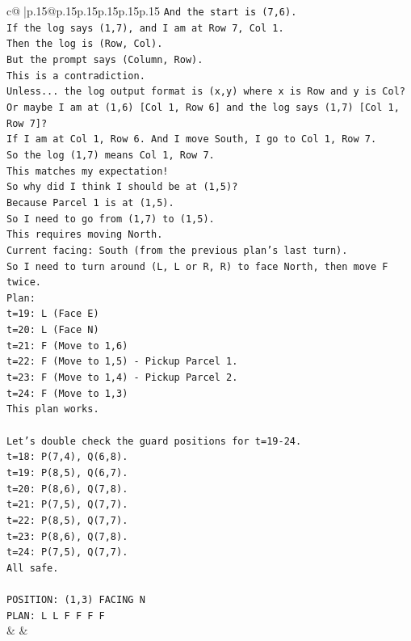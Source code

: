 \documentclass{article}
\begin{document}
{\begin{supertabular}{c@{$\;$}|p{.15\linewidth}@{}p{.15\linewidth}p{.15\linewidth}p{.15\linewidth}p{.15\linewidth}p{.15\linewidth}}
{{{\texttt{And the start is (7,6).} \\
\texttt{If the log says (1,7), and I am at Row 7, Col 1.} \\
\texttt{Then the log is (Row, Col).} \\
\texttt{But the prompt says (Column, Row).} \\
\texttt{This is a contradiction.} \\
\texttt{Unless... the log output format is (x,y) where x is Row and y is Col?} \\
\texttt{Or maybe I am at (1,6) {[}Col 1, Row 6{]} and the log says (1,7) {[}Col 1, Row 7{]}?} \\
\texttt{If I am at Col 1, Row 6. And I move South, I go to Col 1, Row 7.} \\
\texttt{So the log (1,7) means Col 1, Row 7.} \\
\texttt{This matches my expectation!} \\
\texttt{So why did I think I should be at (1,5)?} \\
\texttt{Because Parcel 1 is at (1,5).} \\
\texttt{So I need to go from (1,7) to (1,5).} \\
\texttt{This requires moving North.} \\
\texttt{Current facing: South (from the previous plan's last turn).} \\
\texttt{So I need to turn around (L, L or R, R) to face North, then move F twice.} \\
\texttt{Plan:} \\
\texttt{t=19: L (Face E)} \\
\texttt{t=20: L (Face N)} \\
\texttt{t=21: F (Move to 1,6)} \\
\texttt{t=22: F (Move to 1,5) {-} Pickup Parcel 1.} \\
\texttt{t=23: F (Move to 1,4) {-} Pickup Parcel 2.} \\
\texttt{t=24: F (Move to 1,3)} \\
\texttt{This plan works.} \\
\\ 
\texttt{Let's double check the guard positions for t=19{-}24.} \\
\texttt{t=18: P(7,4), Q(6,8).} \\
\texttt{t=19: P(8,5), Q(6,7).} \\
\texttt{t=20: P(8,6), Q(7,8).} \\
\texttt{t=21: P(7,5), Q(7,7).} \\
\texttt{t=22: P(8,5), Q(7,7).} \\
\texttt{t=23: P(8,6), Q(7,8).} \\
\texttt{t=24: P(7,5), Q(7,7).} \\
\texttt{All safe.} \\
\\ 
\texttt{POSITION: (1,3) FACING N} \\
\texttt{PLAN: L L F F F F} \\
            }
        }
    }
    & & \\ \\


\end{supertabular}}
\end{document}
